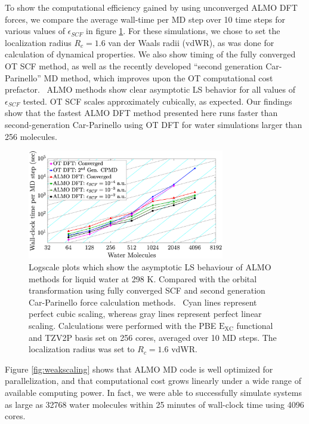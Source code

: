 \documentclass[aps,prl,reprint,amsmath,amssymb]{revtex4-1}
\begin{document}

To show the computational efficiency gained by using unconverged ALMO DFT forces, we compare the average wall-time per MD step over 10 time steps for various values of $\epsilon_{SCF}$ in figure \ref{fig:strongscaling_log}.
For these simulations, we chose to set the localization radius $R_{c} = 1.6$ van der Waals radii (vdWR), as was done for calculation of dynamical properties.
We also show timing of the fully converged OT SCF method, as well as the recently developed ``second generation Car-Parinello'' MD method, which improves upon the OT computational cost prefactor.~\cite{a:2ndcpmd}
ALMO methods show clear asymptotic LS behavior for all values of $\epsilon_{SCF}$ tested.
OT SCF scales approximately cubically, as expected.
Our findings show that the fastest ALMO DFT method presented here runs faster than second-generation Car-Parinello using OT DFT for water simulations larger than 256 molecules.

\begin{figure}
\includegraphics[trim={2.5cm 0.5cm 3.4cm 0.1cm},clip,width=8.6cm]{strongscaling_log.eps}
\caption{\label{fig:strongscaling_log} Logscale plots which show the asymptotic LS behaviour of ALMO methods for liquid water at 298 K.
Compared with the orbital transformation using fully converged SCF and second generation Car-Parinello force calculation methods.~\cite{a:ot,a:ot2,a:2ndcpmd}
Cyan lines represent perfect cubic scaling, whereas gray lines represent perfect linear scaling. 
Calculations were performed with the PBE $\mathrm{E_{XC}}$ functional and TZV2P basis set on 256 cores, averaged over 10 MD steps. 
The localization radius was set to $R_{c} = 1.6$ vdWR.}
\end{figure}

Figure \ref{fig:weakscaling} shows that ALMO MD code is well optimized for parallelization, and that computational cost grows linearly under a wide range of available computing power. 
In fact, we were able to successfully simulate systems as large as 32768 water molecules within 25 minutes of wall-clock time using 4096 cores.
\end{document}
